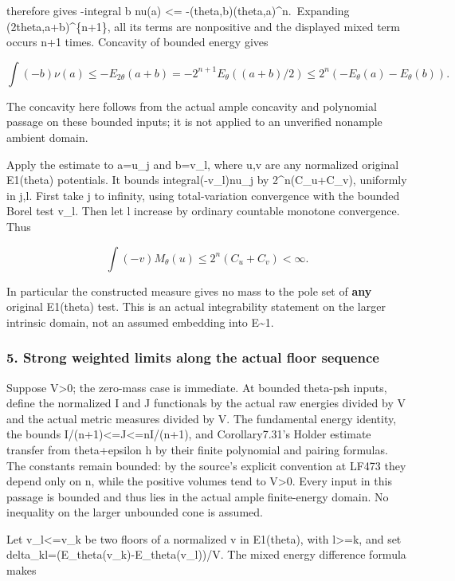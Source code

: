 \documentclass[
  10pt,
]{article}
\begin{document}
therefore gives -integral b nu(a) \textless=
-(theta,b)(theta,a)\^{}n.~Expanding (2theta,a+b)\^{}\{n+1\}, all its
terms are nonpositive and the displayed mixed term occurs n+1 times.
Concavity of bounded energy gives

\[\int(-b)\nu(a)\leq-E_{2\theta}(a+b)
=-2^{n+1}E_\theta((a+b)/2)
\leq2^n(-E_\theta(a)-E_\theta(b)).\]

The concavity here follows from the actual ample concavity and
polynomial passage on these bounded inputs; it is not applied to an
unverified nonample ambient domain.

Apply the estimate to a=u\_j and b=v\_l, where u,v are any normalized
original E1(theta) potentials. It bounds integral(-v\_l)nu\_j by
2\^{}n(C\_u+C\_v), uniformly in j,l. First take j to infinity, using
total-variation convergence with the bounded Borel test v\_l. Then let l
increase by ordinary countable monotone convergence. Thus

\[\int(-v)M_\theta(u)\leq2^n(C_u+C_v)<\infty.\]

In particular the constructed measure gives no mass to the pole set of
\textbf{any} original E1(theta) test. This is an actual integrability
statement on the larger intrinsic domain, not an assumed embedding into
E\textasciitilde1.

\subsubsection{5. Strong weighted limits along the actual floor
sequence}\label{strong-weighted-limits-along-the-actual-floor-sequence}

Suppose V\textgreater0; the zero-mass case is immediate. At bounded
theta-psh inputs, define the normalized I and J functionals by the
actual raw energies divided by V and the actual metric measures divided
by V. The fundamental energy identity, the bounds
I/(n+1)\textless=J\textless=nI/(n+1), and Corollary7.31's Holder
estimate transfer from theta+epsilon h by their finite polynomial and
pairing formulas. The constants remain bounded: by the source's explicit
convention at LF473 they depend only on n, while the positive volumes
tend to V\textgreater0. Every input in this passage is bounded and thus
lies in the actual ample finite-energy domain. No inequality on the
larger unbounded cone is assumed.

Let v\_l\textless=v\_k be two floors of a normalized v in E1(theta),
with l\textgreater=k, and set
delta\_kl=(E\_theta(v\_k)-E\_theta(v\_l))/V. The mixed energy difference
formula makes
\end{document}
